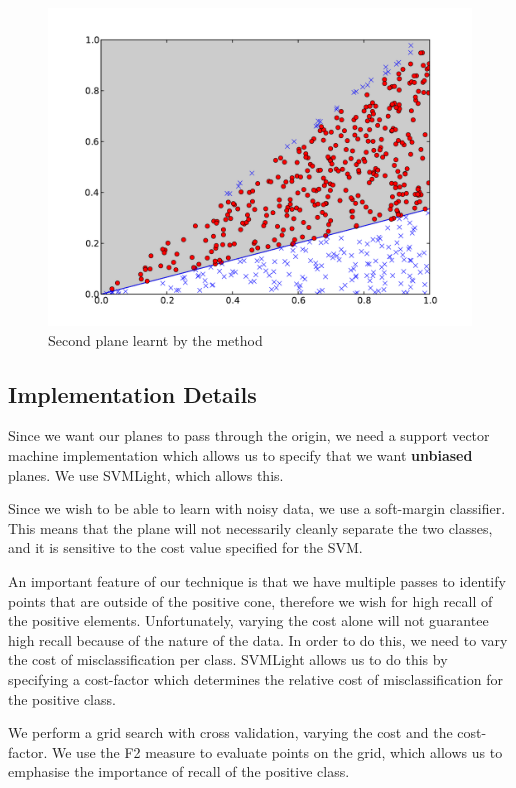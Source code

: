 \documentclass{article}
\begin{document}
\begin{figure}%
\begin{center}
\includegraphics[scale=0.5]{second_plane.pdf}%
\caption{Second plane learnt by the method}
\end{center}
\end{figure}%

\subsection{Implementation Details}

Since we want our planes to pass through the origin, we need a support
vector machine implementation which allows us to specify that we want
\textbf{unbiased} planes. We use SVMLight, which allows this.

Since we wish to be able to learn with noisy data, we use a
soft-margin classifier. This means that the plane will not necessarily
cleanly separate the two classes, and it is sensitive to the cost
value specified for the SVM.

An important feature of our technique is that we have multiple passes
to identify points that are outside of the positive cone, therefore we
wish for high recall of the positive elements. Unfortunately, varying
the cost alone will not guarantee high recall because of the nature of
the data. In order to do this, we need to vary the cost of
misclassification per class. SVMLight allows us to do this by
specifying a cost-factor which determines the relative cost of
misclassification for the positive class.

We perform a grid search with cross validation, varying the cost and
the cost-factor. We use the F2 measure to evaluate points on the grid,
which allows us to emphasise the importance of recall of the positive
class.





\end{document}
